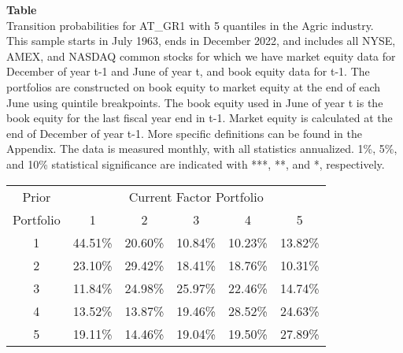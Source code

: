\begin{table*}[ht!]
\raggedright
{}
\label{tab: transition_probs_AT_GR1_Agric_with_5_quantiles}
\textbf{Table \thetable} \\
Transition probabilities for AT_GR1 with 5 quantiles in the Agric industry. \\
\hspace*{1em}This sample starts in July 1963, ends in December 2022, and includes all NYSE, AMEX, and NASDAQ common stocks for which we have market equity data for December of year t-1 and June of year t, and book equity data for t-1. The portfolios are constructed on book equity to market equity at the end of each June using quintile breakpoints.  The book equity used in June of year t is the book equity for the last fiscal year end in t-1.  Market equity is calculated at the end of December of year t-1.  More specific definitions can be found in the Appendix.  The data is measured monthly, with all statistics annualized.  1\%, 5\%, and 10\% statistical significance are indicated with ***, **, and *, respectively. \\
\vspace{0.5em}
\centering
\begin{adjustbox}{max width=\textwidth}
\begin{tabular}{@{}cccccc@{}}
\toprule
Prior & \multicolumn{5}{c}{Current Factor Portfolio} \\
Portfolio & 1 & 2 & 3 & 4 & 5 \\
\midrule
1 & 44.51\% & 20.60\% & 10.84\% & 10.23\% & 13.82\% \\
2 & 23.10\% & 29.42\% & 18.41\% & 18.76\% & 10.31\% \\
3 & 11.84\% & 24.98\% & 25.97\% & 22.46\% & 14.74\% \\
4 & 13.52\% & 13.87\% & 19.46\% & 28.52\% & 24.63\% \\
5 & 19.11\% & 14.46\% & 19.04\% & 19.50\% & 27.89\% \\
\bottomrule
\end{tabular}
\end{adjustbox}
\end{table*}